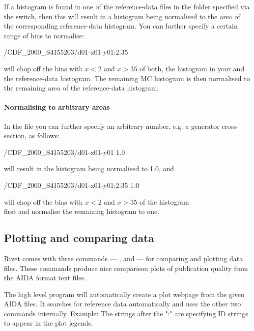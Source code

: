 \documentclass{JHEP3}
\begin{document}
If a histogram  is found in one of the
reference-data files in the folder specified via the  switch, then this
will result in a histogram  being
normalised to the area of the corresponding reference-data histogram.  You can
further specify a certain range of bins to normalise:
%
\begin{snippet}
/CDF_2000_S4155203/d01-x01-y01:2:35
\end{snippet}
%
\noindent will chop off the bins
with $x<2$ and $x>35$ of both, the histogram in your  and the
reference-data histogram. The remaining MC histogram is then normalised to the
remaining area of the reference-data histogram.

\paragraph{Normalising to arbitrary areas}%
In the file  you
can further specify an arbitrary number, e.g. a generator cross-section, as
follows: 
%
\begin{snippet}
/CDF_2000_S4155203/d01-x01-y01  1.0
\end{snippet}
\noindent will result in the histogram  being
normalised to 1.0, and
%
\begin{snippet}
/CDF_2000_S4155203/d01-x01-y01:2:35  1.0
\end{snippet}
%
\noindent will chop off the bins with $x<2$ and $x>35$ of the histogram\\
 first and normalise the remaining
histogram to one.


\subsection{Plotting and comparing data}
Rivet comes with three commands --- ,  and
 --- for comparing and plotting data files. These commands
produce nice comparison plots of publication quality from the AIDA format text
files.

The high level program  will automatically create a plot
webpage from the given AIDA files. It searches for reference data automatically
and uses the other two commands internally. Example:
The strings after the ":" are specifying ID strings to
appear in the plot legends.
\end{document}
